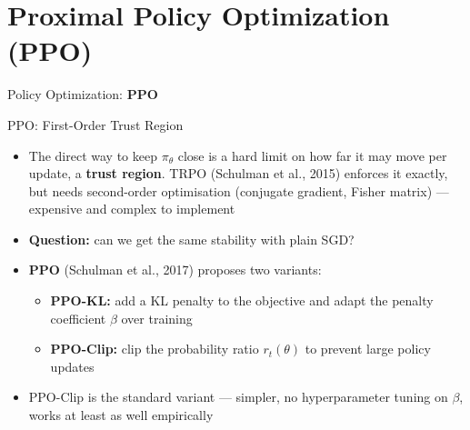 \section{Proximal Policy Optimization (PPO)}
\begin{frame}{}
    \LARGE Policy Optimization: \textbf{PPO}
\end{frame}

\begin{frame}{PPO: First-Order Trust Region}
\begin{itemize}
    \item The direct way to keep $\pi_\theta$ close is a hard limit on how far it may move per update, a \textbf{trust region}. TRPO (Schulman et al., 2015) enforces it exactly, but needs second-order optimisation (conjugate gradient, Fisher matrix) --- expensive and complex to implement
    \item \textbf{Question:} can we get the same stability with plain SGD?
    \pause
    \item \textbf{PPO} (Schulman et al., 2017) proposes two variants:
    \begin{itemize}
        \item \textbf{PPO-KL:} add a KL penalty to the objective and adapt the penalty coefficient $\beta$ over training
        \item \textbf{PPO-Clip:} clip the probability ratio $r_t(\theta)$ to prevent large policy updates
    \end{itemize}
    \item PPO-Clip is the standard variant --- simpler, no hyperparameter tuning on $\beta$, works at least as well empirically
\end{itemize}
\end{frame}
